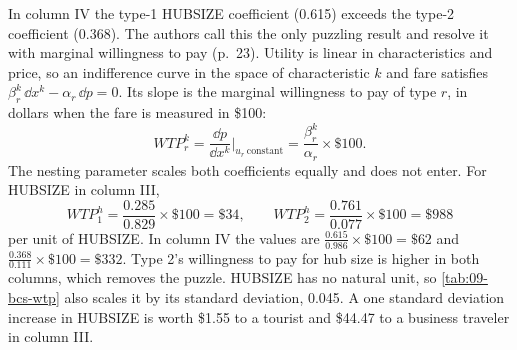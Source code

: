 In column IV the type-1 HUBSIZE coefficient (0.615) exceeds the type-2 coefficient (0.368). The authors call
this the only puzzling result and resolve it with marginal willingness to pay (p.~23). Utility is linear in
characteristics and price, so an indifference curve in the space of characteristic $k$ and fare satisfies
$\beta^k_r\,\dd x^k-\alpha_r\,\dd p=0$. Its slope is the marginal willingness to pay of type $r$, in dollars
when the fare is measured in \$100:
\begin{equation}\label{eq:09-bcs-wtp}
\mathit{WTP}^k_r=\frac{\dd p}{\dd x^k}\bigg|_{u_r\ \text{constant}}=\frac{\beta^k_r}{\alpha_r}\times\$100 .
\end{equation}
The nesting parameter scales both coefficients equally and does not enter. For HUBSIZE in column III,
\begin{equation*}
\mathit{WTP}^h_1=\frac{0.285}{0.829}\times\$100=\$34,\qquad
\mathit{WTP}^h_2=\frac{0.761}{0.077}\times\$100=\$988
\end{equation*}
per unit of HUBSIZE. In column IV the values are $\frac{0.615}{0.986}\times\$100=\$62$ and
$\frac{0.368}{0.111}\times\$100=\$332$. Type 2's willingness to pay for hub size is higher in both columns,
which removes the puzzle. HUBSIZE has no natural unit, so \cref{tab:09-bcs-wtp} also scales it by its
standard deviation, 0.045. A one standard deviation increase in HUBSIZE is worth \$1.55 to a tourist and
\$44.47 to a business traveler in column III.

